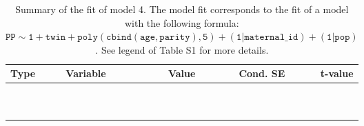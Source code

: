 \begin{table}

\caption{\label{tab:tab4}Summary of the fit of model 4. The model fit corresponds to the fit of a model with the following formula: {\small$\mathtt{PP \sim 1 + twin + poly(cbind(age, parity), 5) + (1 | maternal\_id) + (1 | pop)}$}. See legend of Table S1 for more details.}
\centering
\fontsize{8}{10}\selectfont
\begin{tabular}[t]{>{\raggedright\arraybackslash}p{3cm}>{\raggedright\arraybackslash}p{5cm}rrr}
\toprule
Type & Variable & Value & Cond. SE & t-value\\
\midrule
\cellcolor{gray!6}{fixed effects} & \cellcolor{gray!6}{$\beta_1$} & \cellcolor{gray!6}{1.57} & \cellcolor{gray!6}{0.179} & \cellcolor{gray!6}{8.74}\\
\cellcolor{gray!6}{} & \cellcolor{gray!6}{$\beta_{\mathtt{twin}}$} & \cellcolor{gray!6}{-0.412} & \cellcolor{gray!6}{0.0636} & \cellcolor{gray!6}{-6.47}\\
\cellcolor{gray!6}{} & \cellcolor{gray!6}{$\beta_{\mathtt{age}}$} & \cellcolor{gray!6}{-420} & \cellcolor{gray!6}{59.7} & \cellcolor{gray!6}{-7.04}\\
\cellcolor{gray!6}{} & \cellcolor{gray!6}{$\beta_{\mathtt{age}^2}$} & \cellcolor{gray!6}{-185} & \cellcolor{gray!6}{51.7} & \cellcolor{gray!6}{-3.57}\\
\cellcolor{gray!6}{} & \cellcolor{gray!6}{$\beta_{\mathtt{age}^3}$} & \cellcolor{gray!6}{-43.7} & \cellcolor{gray!6}{32.6} & \cellcolor{gray!6}{-1.34}\\
\cellcolor{gray!6}{} & \cellcolor{gray!6}{$\beta_{\mathtt{age}^4}$} & \cellcolor{gray!6}{-15.7} & \cellcolor{gray!6}{14.3} & \cellcolor{gray!6}{-1.09}\\
\cellcolor{gray!6}{} & \cellcolor{gray!6}{$\beta_{\mathtt{age}^5}$} & \cellcolor{gray!6}{2.47} & \cellcolor{gray!6}{9.7} & \cellcolor{gray!6}{0.255}\\
\cellcolor{gray!6}{} & \cellcolor{gray!6}{$\beta_{\mathtt{parity}}$} & \cellcolor{gray!6}{49.1} & \cellcolor{gray!6}{97.6} & \cellcolor{gray!6}{0.502}\\
\cellcolor{gray!6}{} & \cellcolor{gray!6}{$\beta_{\mathtt{age}\times\mathtt{parity}}$} & \cellcolor{gray!6}{12922} & \cellcolor{gray!6}{39528} & \cellcolor{gray!6}{0.327}\\
\cellcolor{gray!6}{} & \cellcolor{gray!6}{$\beta_{\mathtt{age}^2\times\mathtt{parity}}$} & \cellcolor{gray!6}{-33721} & \cellcolor{gray!6}{30550} & \cellcolor{gray!6}{-1.1}\\

\end{tabular}
\end{table}
